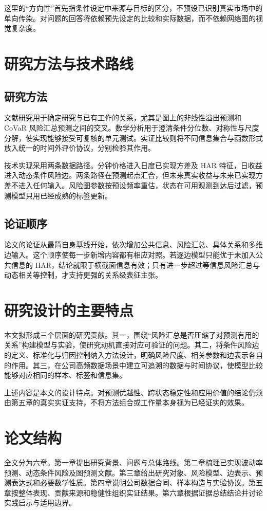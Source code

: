 这里的“方向性”首先指条件设定中来源与目标的区分，不预设已识别真实市场中的单向传染。对问题的回答将依赖预先设定的比较和实际数据，而不依赖网络图的视觉复杂度。

\section{研究方法与技术路线}
\subsection{研究方法}
文献研究用于确定研究与已有工作的关系，尤其是图上的非线性溢出预测和 CoVaR 风险汇总预测之间的交叉。数学分析用于澄清条件分位数、对称性与尺度分解，使实现能够接受可复核的单元测试。实证比较则将不同信息集合与函数形式放入统一的时间外评价协议，分别检验其作用。

技术实现采用两条数据路径。分钟价格进入日度已实现方差及 HAR 特征，日收益进入动态条件风险边。两条路径在预测起点汇合，但未来真实收益与未来已实现方差不进入任何输入。风险图参数按预设频率重估，状态在可用观测到达后过滤，预测模型只用已经成熟的标签更新。

\subsection{论证顺序}
论文的论证从最简自身基线开始，依次增加公共信息、风险汇总、具体关系和多维边输入。这个顺序使每一步新增内容都有相应对照。若逐边模型只能优于未加入公共信息的 HAR，结论就限于横截面信息有效；只有进一步超过等信息风险汇总与动态相关等控制，才支持更强的关系级表征主张。

\section{研究设计的主要特点}
本文拟形成三个层面的研究贡献。其一，围绕“风险汇总是否压缩了对预测有用的关系”构建模型与实验，使研究动机直接对应可验证的问题。其二，将条件风险边的定义、标准化与归因控制纳入方法设计，明确风险尺度、相关参数和边表示各自的作用。其三，在公司高频数据场景中建立可追溯的数据与时间协议，使模型比较能够对应相同的样本、标签和信息集。

上述内容是本文的设计特点。对预测优越性、跨状态稳定性和应用价值的结论仍须由第五章的真实实证支持，不将方法组合或工作量本身视为已经证实的效果。

\section{论文结构}
全文分为六章。第一章提出研究背景、问题与总体路线。第二章梳理已实现波动率预测、动态条件风险及图预测文献。第三章给出研究对象、风险模型、边表示、预测表达式和必要数学性质。第四章说明公司数据合同、样本构造与实验协议。第五章按整体表现、贡献来源和稳健性组织实证结果。第六章根据证据总结结论并讨论实践启示与适用边界。
